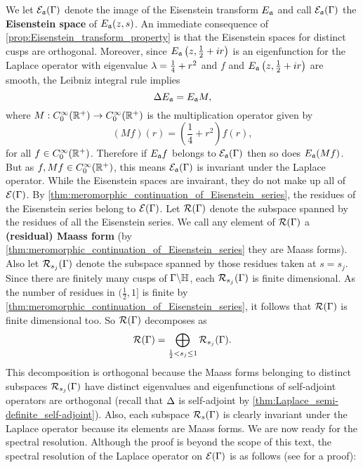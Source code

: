       We let $\mathcal{E}_{\mathfrak{a}}(\Gamma)$ denote the image of the Eisenstein transform $E_{\mathfrak{a}}$ and call $\mathcal{E}_{\mathfrak{a}}(\Gamma)$ the \textbf{Eisenstein space} of $E_{\mathfrak{a}}(z,s)$. An immediate consequence of \cref{prop:Eisenstein_transform_property} is that the Eisenstein spaces for distinct cusps are orthogonal. Moreover, since $E_{\mathfrak{a}}\left(z,\frac{1}{2}+ir\right)$ is an eigenfunction for the Laplace operator with eigenvalue $\lambda = \frac{1}{4}+r^{2}$ and $f$ and $E_{\mathfrak{a}}\left(z,\frac{1}{2}+ir\right)$ are smooth, the Leibniz integral rule implies
      \[
        \Delta E_{\mathfrak{a}}= E_{\mathfrak{a}}M,
      \]
      where $M:C_{0}^{\infty}(\mathbb{R}^{+}) \to C_{0}^{\infty}(\mathbb{R}^{+})$ is the multiplication operator given by
      \[
        (Mf)(r) = \left(\frac{1}{4}+r^{2}\right)f(r),
      \]
      for all $f \in C_{0}^{\infty}(\mathbb{R}^{+})$. Therefore if $E_{\mathfrak{a}}f$ belongs to $\mathcal{E}_{\mathfrak{a}}(\Gamma)$ then so does $E_{\mathfrak{a}}(Mf)$. But as $f,Mf \in C_{0}^{\infty}(\mathbb{R}^{+})$, this means $\mathcal{E}_{\mathfrak{a}}(\Gamma)$ is invariant under the Laplace operator. While the Eisenstein spaces are invairant, they do not make up all of $\mathcal{E}(\Gamma)$. By \cref{thm:meromorphic_continuation_of_Eisenstein_series}, the residues of the Eisenstein series belong to $\mathcal{E}(\Gamma)$. Let $\mathcal{R}(\Gamma)$ denote the subspace spanned by the residues of all the Eisenstein series. We call any element of $\mathcal{R}(\Gamma)$ a \textbf{(residual) Maass form} (by \cref{thm:meromorphic_continuation_of_Eisenstein_series} they are Maass forms). Also let $\mathcal{R}_{s_{j}}(\Gamma)$ denote the subspace spanned by those residues taken at $s = s_{j}$. Since there are finitely many cusps of $\Gamma\backslash\mathbb{H}$, each $\mathcal{R}_{s_{j}}(\Gamma)$ is finite dimensional. As the number of residues in $(\frac{1}{2},1]$ is finite by \cref{thm:meromorphic_continuation_of_Eisenstein_series}, it follows that $\mathcal{R}(\Gamma)$ is finite dimensional too. So $\mathcal{R}(\Gamma)$ decomposes as
      \[
        \mathcal{R}(\Gamma) = \bigoplus_{\frac{1}{2} < s_{j} \le 1}\mathcal{R}_{s_{j}}(\Gamma).
      \]
      This decomposition is orthogonal because the Maass forms belonging to distinct subspaces $\mathcal{R}_{s_{j}}(\Gamma)$ have distinct eigenvalues and eigenfunctions of self-adjoint operators are orthogonal (recall that $\Delta$ is self-adjoint by \cref{thm:Laplace_semi-definite_self-adjoint}). Also, each subspace $\mathcal{R}_{s}(\Gamma)$ is clearly invariant under the Laplace operator because its elements are Maass forms.
      We are now ready for the spectral resolution. Although the proof is beyond the scope of this text, the spectral resolution of the Laplace operator on $\mathcal{E}(\Gamma)$ is as follows (see \cite{iwaniec2002spectral} for a proof):

